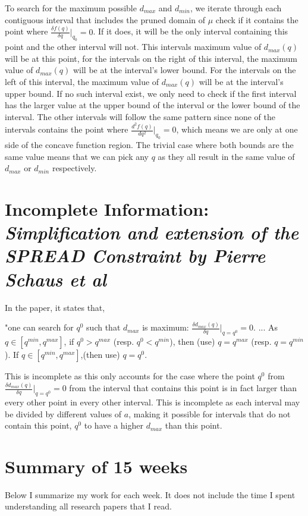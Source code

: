 \documentclass[a4paper,12pt]{article}
\begin{document}
To search for the maximum possible $d_{max}$ and $d_{min}$, we iterate through each contiguous interval that includes the pruned domain of $\mu$  check if it contains the point where $\frac{\delta f(q)}{\delta q} |_{q_{0}} = 0$. If it does, it will be the only interval containing this point and the other interval will not. This intervals maximum value of $d_{max}(q)$ will be at this point, for the intervals on the right of this interval, the maximum value of  $d_{max}(q)$ will be at the interval's lower bound. For the intervals on the left of this interval, the maximum value of  $d_{max}(q)$ will be at the interval's upper bound. If no such interval exist, we only need to check if the first interval has the larger value at the upper bound of the interval or the lower bound of the interval. The other intervals will follow the same pattern since none of the intervals contains the point where $\frac{d^2f(q)}{dq^2} |_{q_{0}} = 0$, which means we are only at one side of the concave function region. The trivial case where both bounds are the same value means that we can pick any $q$ as they all result in the same value of 
$d_{max}$ or $d_{min}$ respectively. 


\section{Incomplete Information: \textit{Simplification and extension of the SPREAD Constraint by Pierre Schaus et al}}

In the paper, it states that, 

"one can search for $q^0$ such that $d_{max}$ is maximum: $\frac{\delta d_{max}(q)}{\delta q} |_{q=q^0} = 0$. ... As $q \in [q^{min}, q^{max}]$, if $q^0>q^{max}$ (resp. $q^0<q^{min}$), then (use) $q=q^{max}$ (resp. $q=q^{min}$). If $q \in [q^{min}, q^{max}]$,(then use) $q=q^0$. 

This is incomplete as this only accounts for the case where the point $q^0$ from $\frac{\delta d_{max}(q)}{\delta q} |_{q=q^0} = 0$ from the interval that contains this point is in fact larger than every other point in every other interval. This is incomplete as each interval may be divided by different values of $a$, making it possible for intervals that do not contain this point, $q^0$ to have a higher 
$d_{max}$ than this point. 

\section{Summary of 15 weeks}
Below I summarize my work for each week. It does not include the time I spent understanding all research papers that I read. 
\end{document}
